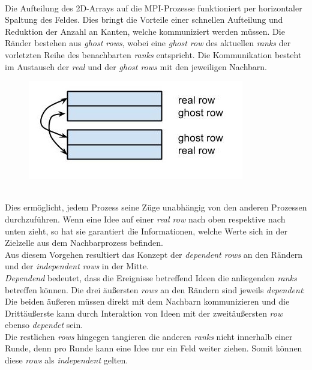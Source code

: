 \quad \\
Die Aufteilung des 2D-Arrays auf die MPI-Prozesse funktioniert per horizontaler Spaltung des Feldes.
Dies bringt die Vorteile einer schnellen Aufteilung und Reduktion der Anzahl an Kanten, welche kommuniziert werden müssen.
Die Ränder bestehen aus \textit{ghost rows}, wobei eine \textit{ghost row} des aktuellen \textit{ranks} der vorletzten Reihe des benachbarten \textit{ranks} entspricht. Die Kommunikation besteht im Austausch der \textit{real} und der \textit{ghost rows} mit den jeweiligen Nachbarn.

\begin{figure}[htbp]
\centering
\includegraphics[scale=1]{pics/real-ghost-rows.jpg}
\end{figure}
\quad \\
Dies ermöglicht, jedem Prozess seine Züge unabhängig von den anderen Prozessen durchzuführen.
Wenn eine Idee auf einer \textit{real row} nach oben respektive nach unten zieht, so hat sie garantiert die Informationen, welche Werte sich in der Zielzelle aus dem Nachbarprozess befinden. \\
Aus diesem Vorgehen resultiert das Konzept der \textit{dependent rows} an den Rändern und der \textit{independent rows} in der Mitte. \\
\textit{Dependend} bedeutet, dass die Ereignisse betreffend Ideen die anliegenden \textit{ranks} betreffen können.
Die drei äußersten \textit{rows} an den Rändern sind jeweils \textit{dependent}:
Die beiden äußeren müssen direkt mit dem Nachbarn kommunizieren und die Drittäußerste kann durch Interaktion von Ideen mit der zweitäußersten \textit{row} ebenso \textit{dependet} sein. \\
Die restlichen \textit{rows} hingegen tangieren die anderen \textit{ranks} nicht innerhalb einer Runde, denn pro Runde kann eine Idee nur ein Feld weiter ziehen.
Somit können diese \textit{rows} als \textit{independent} gelten.

